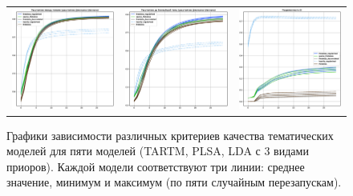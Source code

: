 \begin{figure}
\begin{tabular}{ccc}
    \includegraphics[width=55mm]{images/CH4_improved_diversity_jensenshannon_False.eps} &   \includegraphics[width=55mm]{images/CH4_improved_diversity_jensenshannon_True.eps} & \includegraphics[width=55mm]{images/CH4_improved_SparsityThetaScore.eps} \\
\end{tabular}
    \caption{Графики зависимости различных критериев качества тематических моделей для пяти моделей (TARTM, PLSA, LDA с 3 видами приоров). Каждой модели соответствуют три линии: среднее значение, минимум и максимум (по пяти случайным перезапускам).}
\label{fig:ch4_improved}
\end{figure}


